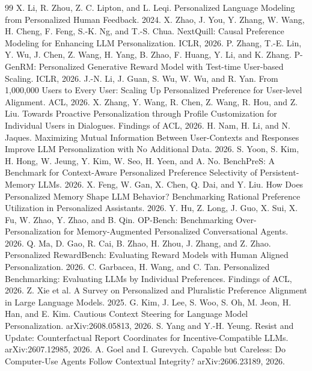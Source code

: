 \begin{thebibliography}{99}
 X. Li, R. Zhou, Z. C. Lipton, and L. Leqi. Personalized Language Modeling from Personalized Human Feedback. 2024.
 X. Zhao, J. You, Y. Zhang, W. Wang, H. Cheng, F. Feng, S.-K. Ng, and T.-S. Chua. NextQuill: Causal Preference Modeling for Enhancing LLM Personalization. ICLR, 2026.
 P. Zhang, T.-E. Lin, Y. Wu, J. Chen, Z. Wang, H. Yang, B. Zhao, F. Huang, Y. Li, and K. Zhang. P-GenRM: Personalized Generative Reward Model with Test-time User-based Scaling. ICLR, 2026.
 J.-N. Li, J. Guan, S. Wu, W. Wu, and R. Yan. From 1,000,000 Users to Every User: Scaling Up Personalized Preference for User-level Alignment. ACL, 2026.
 X. Zhang, Y. Wang, R. Chen, Z. Wang, R. Hou, and Z. Liu. Towards Proactive Personalization through Profile Customization for Individual Users in Dialogues. Findings of ACL, 2026.
 H. Nam, H. Li, and N. Jaques. Maximizing Mutual Information Between User-Contexts and Responses Improve LLM Personalization with No Additional Data. 2026.
 S. Yoon, S. Kim, H. Hong, W. Jeung, Y. Kim, W. Seo, H. Yeen, and A. No. BenchPreS: A Benchmark for Context-Aware Personalized Preference Selectivity of Persistent-Memory LLMs. 2026.
 X. Feng, W. Gan, X. Chen, Q. Dai, and Y. Liu. How Does Personalized Memory Shape LLM Behavior? Benchmarking Rational Preference Utilization in Personalized Assistants. 2026.
 Y. Hu, Z. Long, J. Guo, X. Sui, X. Fu, W. Zhao, Y. Zhao, and B. Qin. OP-Bench: Benchmarking Over-Personalization for Memory-Augmented Personalized Conversational Agents. 2026.
 Q. Ma, D. Gao, R. Cai, B. Zhao, H. Zhou, J. Zhang, and Z. Zhao. Personalized RewardBench: Evaluating Reward Models with Human Aligned Personalization. 2026.
 C. Garbacea, H. Wang, and C. Tan. Personalized Benchmarking: Evaluating LLMs by Individual Preferences. Findings of ACL, 2026.
 Z. Xie et al. A Survey on Personalized and Pluralistic Preference Alignment in Large Language Models. 2025.
 G. Kim, J. Lee, S. Woo, S. Oh, M. Jeon, H. Han, and E. Kim. Cautious Context Steering for Language Model Personalization. arXiv:2608.05813, 2026.
 S. Yang and Y.-H. Yeung. Resist and Update: Counterfactual Report Coordinates for Incentive-Compatible LLMs. arXiv:2607.12985, 2026.
 A. Goel and I. Gurevych. Capable but Careless: Do Computer-Use Agents Follow Contextual Integrity? arXiv:2606.23189, 2026.

\end{thebibliography}
